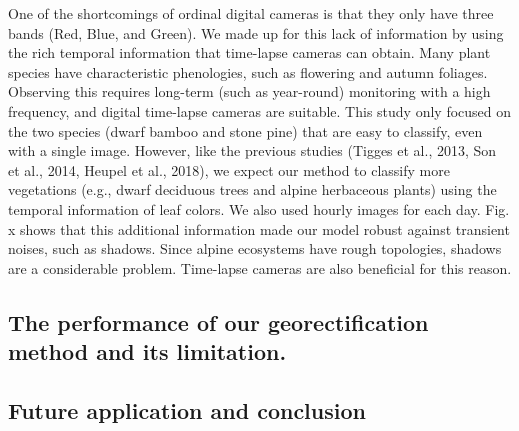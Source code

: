\documentclass{article}
\begin{document}
One of the shortcomings of ordinal digital cameras is that they only
have three bands (Red, Blue, and Green). We made up for this lack of
information by using the rich temporal information that time-lapse
cameras can obtain. Many plant species have characteristic phenologies,
such as flowering and autumn foliages. Observing this requires long-term
(such as year-round) monitoring with a high frequency, and digital
time-lapse cameras are suitable. This study only focused on the two
species (dwarf bamboo and stone pine) that are easy to classify, even
with a single image. However, like the previous studies (Tigges et al.,
2013, Son et al., 2014, Heupel et al., 2018), we expect our method to
classify more vegetations (e.g., dwarf deciduous trees and alpine
herbaceous plants) using the temporal information of leaf colors. We
also used hourly images for each day. Fig. x shows that this additional
information made our model robust against transient noises, such as
shadows. Since alpine ecosystems have rough topologies, shadows are a
considerable problem. Time-lapse cameras are also beneficial for this
reason.

\hypertarget{the-performance-of-our-georectification-method-and-its-limitation.}{%
\subsection{The performance of our georectification method and its
limitation.}\label{the-performance-of-our-georectification-method-and-its-limitation.}}

\hypertarget{future-application-and-conclusion}{%
\subsection{Future application and
conclusion}\label{future-application-and-conclusion}}



\end{document}
